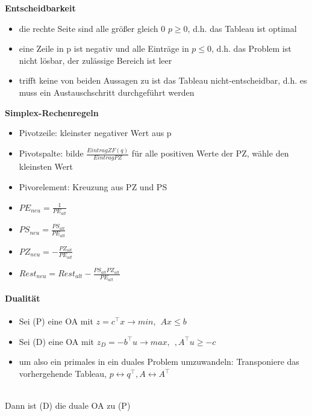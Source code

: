 \documentclass[12pt,a4paper, hyperref]{article}
\begin{document}
\textbf{Entscheidbarkeit}
\begin{itemize}
\item die rechte Seite sind alle größer gleich 0 $p \geq 0$, d.h. das Tableau ist optimal
\item eine Zeile in p ist negativ und alle Einträge in $p \leq 0$, d.h. das Problem ist nicht lösbar, der zulässige Bereich ist leer
\item trifft keine von beiden Aussagen zu ist das Tableau nicht-entscheidbar, d.h. es muss ein Austauschschritt durchgeführt werden
\end{itemize}

\textbf{Simplex-Rechenregeln}
\begin{itemize}
\item Pivotzeile: kleinster negativer Wert aus p
\item Pivotspalte: bilde $\frac{Eintrag ZF (q)}{Eintrag PZ}$ für alle positiven Werte der PZ, wähle den kleinsten Wert
\item Pivorelement: Kreuzung aus PZ und PS
\item $PE_{neu} = \frac{1}{PE_{alt}}$
\item $PS_{neu} = \frac{PS_{alt}}{PE_{alt}}$
\item $PZ_{neu} = -\frac{PZ_{alt}}{PE_{alt}}$
\item $Rest_{neu} = Rest_{alt}-\frac{PS_{alt} PZ_{alt}}{PE_{alt}}$
\end{itemize}

\paragraph{Dualität} 
\flushleft
\begin{itemize}
\item Sei (P) eine OA mit $z = c^\intercal x \rightarrow min, \hspace{5pt} Ax \leq b$
\item Sei (D) eine OA mit $z_D = -b^\intercal u \rightarrow max, \hspace{5pt}, A^\intercal u \geq -c$
\item um also ein primales in ein duales Problem umzuwandeln: Transponiere das vorhergehende Tableau, $p \leftrightarrow q^\intercal, A \leftrightarrow A^\intercal$
\end{itemize}
\hspace{1pt} \\
Dann ist (D) die duale OA zu (P)
\end{document}
